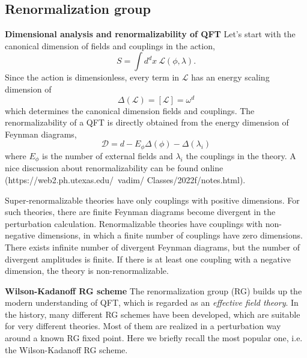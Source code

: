 \documentclass[submission, PhysLectNotes]{SciPost}
\begin{document}
\subsection{Renormalization group}
{\bf Dimensional analysis and renormalizability of QFT}
Let's start with the canonical dimension of fields and couplings in the action,
\begin{equation}
    S = \int d^dx \ \mathcal{L}(\phi, \lambda).
\end{equation}
Since the action is dimensionless, every term in $\mathcal{L}$ has an energy scaling dimension of
\begin{equation}
    \Delta(\mathcal{L}) = [\mathcal{L}] = \omega^d
\end{equation}
which determines the canonical dimension fields and couplings. The renormalizability of a QFT is directly obtained from the energy dimension of Feynman diagrams,
\begin{equation}
    \mathcal{D} = d - E_{\phi} \Delta (\phi) - \Delta (\lambda_i)
\end{equation}
where $E_{\phi}$ is the number of external fields and $\lambda_i$ the couplings in the theory. A nice discussion about renormalizability can be found online (https://web2.ph.utexas.edu/~vadim/
Classes/2022f/notes.html).

Super-renormalizable theories have only couplings with positive dimensions. For such theories, there are finite Feynman diagrams become divergent in the perturbation calculation. Renormalizable theories have couplings with non-negative dimensions, in which a finite number of couplings have zero dimensions. There exists infinite number of divergent Feynman diagrams, but the number of divergent amplitudes is finite. If there is at least one coupling with a negative dimension, the theory is non-renormalizable.

{\bf Wilson-Kadanoff RG scheme}
The renormalization group (RG) builds up the modern understanding of QFT, which is regarded as an {\it effective field theory}. In the history, many different RG schemes have been developed, which are suitable for very different theories. Most of them are realized in a perturbation way around a known RG fixed point. Here we briefly recall the most popular one, i.e. the Wilson-Kadanoff RG scheme.
\end{document}
